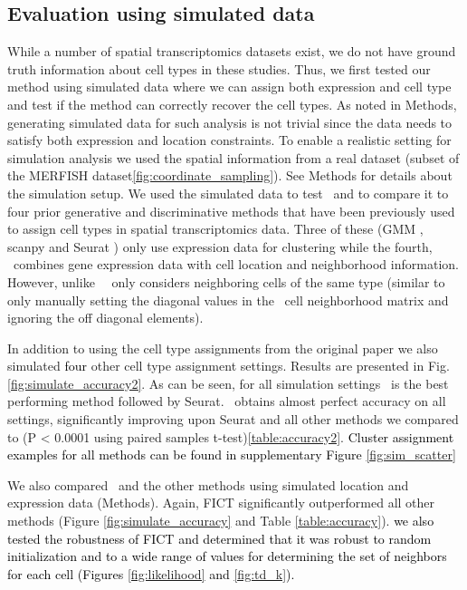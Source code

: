 \subsection{Evaluation using simulated data}
While a number of spatial transcriptomics datasets exist, we do not have ground truth information about cell types in these studies. Thus, we first tested our method using simulated data where we can assign both expression and cell type and test if the method can correctly recover the cell types. 
As noted in Methods, generating simulated data for such analysis is not trivial since the data needs to satisfy both expression and location constraints. To enable a realistic setting for simulation analysis we used the spatial information from a real dataset (subset of the MERFISH dataset\ref{fig:coordinate_sampling}). See Methods for details about the simulation setup. We used the simulated data to test \fict\ and to compare it to four prior generative and discriminative methods that have been previously used to assign cell types in spatial transcriptomics data. Three of these (GMM \cite{tian2019clustering,xie2016unsupervised}, scanpy \cite{wolf2018scanpy,traag2019louvain} and Seurat \cite{stuart2019comprehensive,butler2018integrating,blondel2008fast}) only use expression data for clustering while the fourth, \smfish\ combines gene expression data with cell location and neighborhood information. However, unlike \fict\,  \smfish\ only considers neighboring cells of the same type (similar to only manually setting the diagonal values in the \fict\ cell neighborhood matrix and ignoring the off diagonal elements). 

In addition to using the cell type assignments from the original paper we also simulated \textcolor{black}{four} other cell type assignment settings. Results are presented in Fig.\ref{fig:simulate_accuracy2}. As can be seen, for all simulation settings \fict\ is the best performing method followed by Seurat. \fict\ obtains almost perfect accuracy on all settings, significantly improving upon Seurat and all other methods we compared to (P < 0.0001 using paired samples t-test)\ref{table:accuracy2}. \textcolor{black}{Cluster assignment examples for all methods can be found in supplementary Figure \ref{fig:sim_scatter}}  

We also compared \fict\ and the other methods using simulated location and expression data (Methods). Again, FICT significantly outperformed all other methods (Figure \ref{fig:simulate_accuracy} and Table \ref{table:accuracy}). \textcolor{black}{we also tested the robustness of FICT and determined that it was robust to random initialization and to a wide range of values for determining the set of neighbors for each cell (Figures \ref{fig:likelihood} and \ref{fig:td_k}).}


